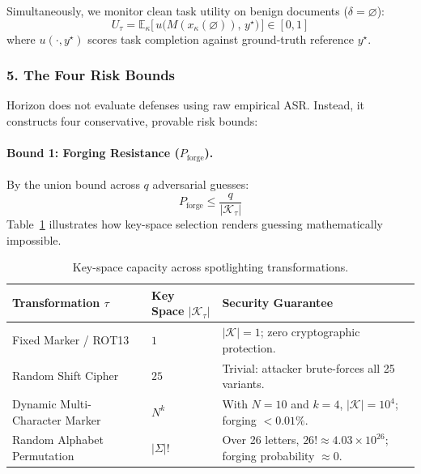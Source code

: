 Simultaneously, we monitor clean task utility on benign documents ($\delta = \varnothing$):
\begin{equation}
    U_\tau = \mathbb{E}_{\kappa}\big[\, u\big(M(x_\kappa(\varnothing)),\, y^\star\big) \,\big] \in [0, 1]
\end{equation}
where $u(\cdot, y^\star)$ scores task completion against ground-truth reference $y^\star$.

\subsubsection{5. The Four Risk Bounds}
Horizon does not evaluate defenses using raw empirical ASR. Instead, it constructs four conservative, provable risk bounds:

\paragraph{Bound 1: Forging Resistance ($P_{\mathrm{forge}}$).}
By the union bound across $q$ adversarial guesses:
\begin{equation}
    P_{\mathrm{forge}} \le \frac{q}{|\mathcal{K}_\tau|}
\end{equation}
Table~\ref{tab:keyspaces} illustrates how key-space selection renders guessing mathematically impossible.

\begin{table}[htbp]
\centering
\small
\caption{Key-space capacity across spotlighting transformations.}
\label{tab:keyspaces}
\begin{tabular}{@{}p{4.5cm} p{3.2cm} p{7.5cm}@{}}
\toprule
\textbf{Transformation $\tau$} & \textbf{Key Space $|\mathcal{K}_\tau|$} & \textbf{Security Guarantee} \\
\midrule
Fixed Marker / ROT13 & $1$ & $|\mathcal{K}|=1$; zero cryptographic protection. \\
Random Shift Cipher & $25$ & Trivial: attacker brute-forces all 25 variants. \\
Dynamic Multi-Character Marker & $N^k$ & With $N=10$ and $k=4$, $|\mathcal{K}|=10^4$; forging $< 0.01\%$. \\
Random Alphabet Permutation & $|\Sigma|!$ & Over 26 letters, $26! \approx 4.03 \times 10^{26}$; forging probability $\approx 0$. \\
\bottomrule
\end{tabular}
\end{table}

